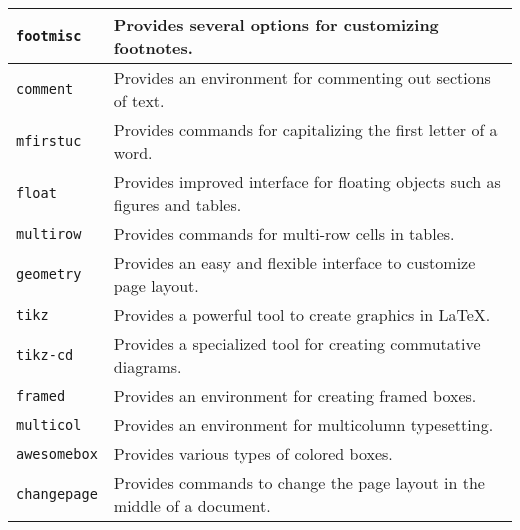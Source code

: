 \documentclass[11pt]{report}
\begin{document}
	\noindent\begin{tabularx}{\linewidth}{|X|X|}
		\verb|footmisc|         & Provides several options for customizing footnotes.                                                                    \\
		\hline
		\verb|comment|          & Provides an environment for commenting out sections of text.                                                           \\
		\hline
		\verb|mfirstuc|         & Provides commands for capitalizing the first letter of a word.                                                         \\
		\hline
		\verb|float|            & Provides improved interface for floating objects such as figures and tables.                                           \\
		\hline
		\verb|multirow|         & Provides commands for multi-row cells in tables.                                                                       \\
		\hline
		\verb|geometry|         & Provides an easy and flexible interface to customize page layout.                                                      \\
		\hline
		\verb|tikz|             & Provides a powerful tool to create graphics in LaTeX.                                                                  \\
		\hline
		\verb|tikz-cd|          & Provides a specialized tool for creating commutative diagrams.                                                         \\
		\hline
		\verb|framed|           & Provides an environment for creating framed boxes.                                                                     \\
		\hline
		\verb|multicol|         & Provides an environment for multicolumn typesetting.                                                                   \\
		\hline
		\verb|awesomebox|       & Provides various types of colored boxes.                                                                               \\
		\hline
		\verb|changepage|       & Provides commands to change the page layout in the middle of a document.                                               \\
		\hline
	\end{tabularx}

\end{document}
